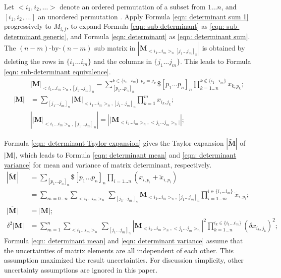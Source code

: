 \documentclass[twoside]{article}
\numberwithin{equation}{section}
\begin{document}
Let ${<i_1,i_2,\dots>}$ denote an ordered permutation of a subset from $1\dots n$, and ${[i_1,i_2,\dots]}$ an unordered permutation \cite{Linear_Algebra}.
Apply Formula \eqref{eqn: determinant sum 1} progressively to $M_{i,j}$, to expand Formula \eqref{eqn: sub-determinant} as \eqref{eqn: sub-determinant generic}, and Formula \eqref{eqn: determinant} as \eqref{eqn: determinant sum}.
The $(n-m)$-by-$(n-m)$ sub matrix in $|\mathbf{M}_{<i_1 \dots i_m>_n[j_1 \dots j_m]_n}|$ is obtained by deleting the rows in $\{i_1 \dots i_m\}$ and the columns in $\{j_1 \dots j_m\}$.
This leads to Formula \eqref{eqn: sub-determinant equivalence}.
\begin{align}
\label{eqn: sub-determinant generic}
&|\mathbf{M}|_{<i_1 \dots i_m>_n, [j_1 \dots j_m]_n} \equiv \sum_{[p_1 \dots p_n]_n}^{k \in \{i_1 \dots i_m\}: p_k=j_k} \$ [p_1\dots p_n]_n 
	\prod_{k = 1 \dots n }^{k \not \in \{i_1 \dots i_m\}} x_{k,p_{k}}; \\
\label{eqn: determinant sum}
|\mathbf{M}| &= \sum_{{[j_1 \dots j_m]}_n} |\mathbf{M}| _{<i_1 \dots i_m>_n, [j_1 \dots j_m]_n} \prod_{k=1}^{m} x_{i_k, j_k}; \\
\label{eqn: sub-determinant equivalence}
&\left| |\mathbf{M}|_{<i_1 \dots i_m>_n, [j_1 \dots j_m]_n} \right| = \left| |\mathbf{M}_{<i_1 \dots i_m>_n, <j_1 \dots j_m>_n|} \right|;
\end{align}

Formula \eqref{eqn: determinant Taylor expansion} gives the Taylor expansion $|\widetilde{\mathbf{M}}|$ of $|\mathbf{M}|$, which leads to Formula \eqref{eqn: determinant mean} and \eqref{eqn: determinant variance} for mean and variance of matrix determinant, respectively.
\begin{align}
\label{eqn: determinant Taylor expansion}
|\widetilde{\mathbf{M}}| &= \sum_{[p_1\dots p_n]_n} \$ [p_1\dots p_n]_n  \prod_{i=1 \dots n} (x_{i,p_i} + \tilde{x}_{i,p_{i}}) \\
	&= \sum_{m=0 \dots n} \sum_{<i_1 \dots i_m>_n} \sum_{[j_1 \dots j_{m}]_n} 
		\mathbf{M}_{<i_1 \dots i_m>_n, [j_1 \dots j_{m}]_n} \prod_{i=1 \dots m}^{i \in \{i_1 \dots i_m\}} \tilde{x}_{i,p_{i}}; \nonumber \\
\label{eqn: determinant mean}
\overline{|\mathbf{M}|} &= |\mathbf{M}|; \\
\label{eqn: determinant variance}
\delta^2 |\mathbf{M}| &= \sum_{m=1}^{n} \sum_{<i_1 \dots i_m>_n} \sum_{[j_1 \dots j_m]_n}
  	|\mathbf{M}_{<i_1 \dots i_m>_n, <j_1 \dots j_m>_n}|^2 \prod _{k=1 \dots n}^{i_k \in \{i_1 \dots i_m\}} (\delta x_{i_k, j_k})^2; 
\end{align}
Formula \eqref{eqn: determinant mean} and \eqref{eqn: determinant variance} assume that the uncertainties of matrix elements are all independent of each other.
This assumption maximized the result uncertainties.
For discussion simplicity, other uncertainty assumptions are ignored in this paper.
\end{document}
